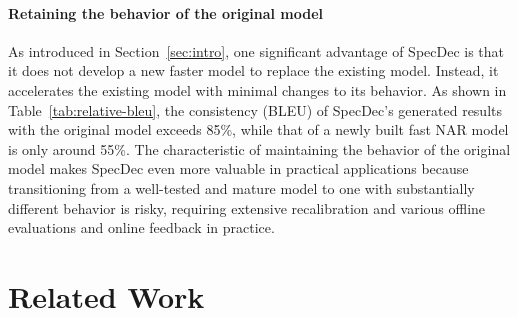 \paragraph{Retaining the behavior of the original model} As introduced in Section~\ref{sec:intro}, one significant advantage of SpecDec is that it does not develop a new faster model to replace the existing model. Instead, it accelerates the existing model with minimal changes to its behavior. As shown in Table~\ref{tab:relative-bleu}, the consistency (BLEU) of SpecDec's generated results with the original model exceeds 85\%, while that of a newly built fast NAR model is only around 55\%. The characteristic of maintaining the behavior of the original model makes SpecDec even more valuable in practical applications because transitioning from a well-tested and mature model to one with substantially different behavior is risky, requiring extensive recalibration and various offline evaluations and online feedback in practice. 

\section{Related Work}\label{sec:related}

